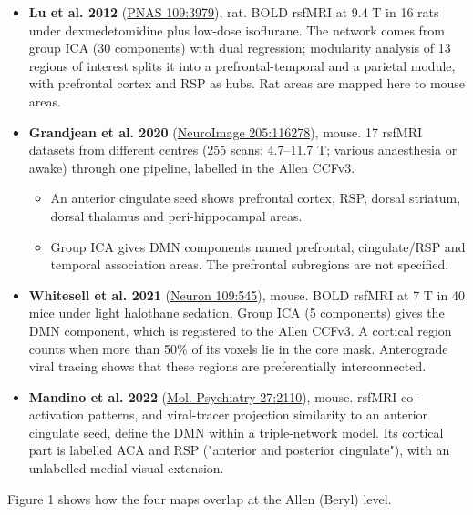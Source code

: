 \documentclass[10pt,a4paper]{article}
\begin{document}
\begin{itemize}
\item \textbf{Lu et al. 2012} (\href{https://www.pnas.org/doi/full/10.1073/pnas.1200506109}{PNAS 109:3979}), rat. BOLD rsfMRI at 9.4 T in 16 rats under dexmedetomidine plus low-dose isoflurane. The network comes from group ICA (30 components) with dual regression; modularity analysis of 13 regions of interest splits it into a prefrontal-temporal and a parietal module, with prefrontal cortex and RSP as hubs. Rat areas are mapped here to mouse areas.
\item \textbf{Grandjean et al. 2020} (\href{https://doi.org/10.1016/j.neuroimage.2019.116278}{NeuroImage 205:116278}), mouse. 17 rsfMRI datasets from different centres (255 scans; 4.7--11.7 T; various anaesthesia or awake) through one pipeline, labelled in the Allen CCFv3. 
\begin{itemize}
\item An anterior cingulate seed shows prefrontal cortex, RSP, dorsal striatum, dorsal thalamus and peri-hippocampal areas.
\item Group ICA gives DMN components named prefrontal, cingulate/RSP and temporal association areas. The prefrontal subregions are not specified.
\end{itemize}
\item \textbf{Whitesell et al. 2021} (\href{https://doi.org/10.1016/j.neuron.2020.11.011}{Neuron 109:545}), mouse. BOLD rsfMRI at 7 T in 40 mice under light halothane sedation. Group ICA (5 components) gives the DMN component, which is registered to the Allen CCFv3. A cortical region counts when more than 50\% of its voxels lie in the core mask. Anterograde viral tracing shows that these regions are preferentially interconnected.
\item \textbf{Mandino et al. 2022} (\href{https://doi.org/10.1038/s41380-021-01298-5}{Mol. Psychiatry 27:2110}), mouse. rsfMRI co-activation patterns, and viral-tracer projection similarity to an anterior cingulate seed, define the DMN within a triple-network model. Its cortical part is labelled ACA and RSP ("anterior and posterior cingulate"), with an unlabelled medial visual extension.
\end{itemize}
Figure 1 shows how the four maps overlap at the Allen (Beryl) level.
\end{document}
